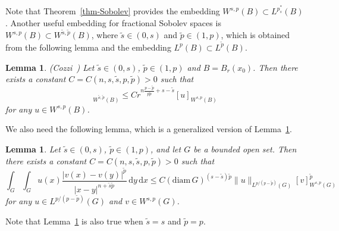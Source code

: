 \documentclass[11pt]{amsart}
\theoremstyle{plain}
\newtheorem{lemma}[theorem]{Lemma}
\theoremstyle{definition}
\numberwithin{equation}{section}
\begin{document}
Note that Theorem~\ref{thm-Sobolev} provides the embedding $W^{s, p}(B) \subset L^{p^{\ast}_s}(B)$. Another useful embedding for fractional Sobolev spaces is $W^{s, p}(B) \subset W^{\tilde{s}, \tilde{p}}(B)$, where $\tilde{s} \in (0,s)$ and $\tilde{p} \in (1, p)$, which is obtained from the following lemma and the embedding $L^p(B) \subset L^{\tilde{p}}(B)$.

\begin{lemma}\label{lem-Jensen}
\textup{(Cozzi~\cite[Lemma~4.6]{Coz17})}
Let $\tilde{s} \in (0,s)$, $\tilde{p} \in (1, p)$ and $B=B_r(x_0)$. Then there exists a constant $C=C(n, s, \tilde{s}, p, \tilde{p}) > 0$ such that
\begin{equation*}
[u]_{W^{\tilde{s}, \tilde{p}}(B)} \leq C r^{n\frac{p-\tilde{p}}{p\tilde{p}}+s-\tilde{s}} [u]_{W^{s, p}(B)}
\end{equation*}
for any $u \in W^{s, p}(B)$.
\end{lemma}

We also need the following lemma, which is a generalized version of Lemma~\ref{lem-Jensen}.

\begin{lemma}\label{lem-Holder}
Let $\tilde{s} \in (0,s)$, $\tilde{p} \in (1, p)$, and let $G$ be a bounded open set. Then there exists a constant $C=C(n, s, \tilde{s}, p, \tilde{p}) > 0$ such that
\begin{equation}\label{eq-Holder}
\int_G \int_G u(x) \frac{|v(x)-v(y)|^{\tilde{p}}}{|x-y|^{n+\tilde{s}\tilde{p}}} \,\mathrm{d}y\,\mathrm{d}x \leq C (\mathrm{diam}\,G)^{(s-\tilde{s})\tilde{p}} \|u\|_{L^{p/(p-\tilde{p})}(G)} [v]_{W^{s, p}(G)}^{\tilde{p}}
\end{equation}
for any $u \in L^{p/(p-\tilde{p})}(G)$ and $v \in W^{s, p}(G)$.
\end{lemma}

Note that Lemma~\ref{lem-Holder} is also true when $\tilde{s}=s$ and $\tilde{p}=p$.
\end{document}
